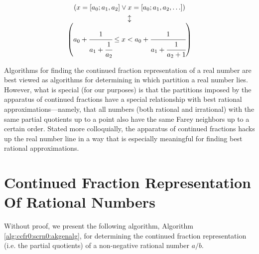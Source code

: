 \begin{equation}
\label{eq:ccfr0:spar0:03}
\begin{array}{c}
 (x=[a_0; a_1, a_2] \vee x=[a_0; a_1, a_2, \ldots ] ) \vspace{0.05in}\\
\updownarrow \vspace{0.0in}\\
\left(
{
a_0+\cfrac{1}{a_1 + \cfrac{1}{a_2}} \leq x < a_0+\cfrac{1}{a_1 + \cfrac{1}{a_2+1}}
}
\right)
\end{array}
\end{equation}

Algorithms for finding the continued fraction representation
of a real number are best viewed as algorithms for
determining in which partition a real number lies.  However, what is
special (for our purposes) is that the partitions imposed by the 
apparatus of continued fractions have a special relationship
with best rational approximations---namely, that all numbers (both
rational and irrational) with the same partial quotients up to a 
point also have the same Farey neighbors up to a certain order.
Stated more colloquially, the apparatus of continued fractions
hacks up the real number line in a way that is especially meaningful
for finding best rational approximations.


\section[CF Representation Of Rationals]
        {Continued Fraction Representation Of Rational Numbers}

Without proof, we present the following algorithm, Algorithm 
\ref{alg:ccfr0:scrn0:akgenalg}, for
determining the continued fraction representation (i.e. the partial
quotients) of a non-negative
rational number $a/b$.

